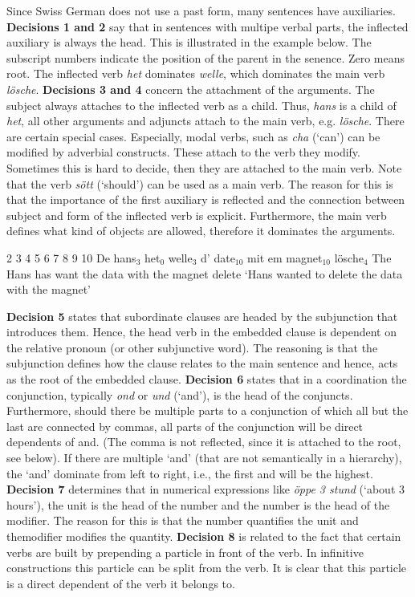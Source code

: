 \documentclass[11pt,letterpaper, covington]{article}
\begin{document}
Since Swiss German does not use a past form, many sentences have auxiliaries. \textbf{Decisions 1 and 2} say that in sentences with multipe verbal parts, the inflected auxiliary is always the head. This is illustrated in the example below. The subscript numbers indicate the position of the parent in the senence. Zero means root. The inflected verb \emph{het} dominates \emph{welle}, which dominates the main verb \emph{lösche}. \textbf{Decisions 3 and 4} concern the attachment of the arguments. The subject always attaches to the inflected verb as a child. Thus, \emph{hans} is a child of \emph{het}, all other arguments and adjuncts attach to the main verb, e.g. \emph{lösche}. There are certain special cases. Especially, modal verbs, such as \emph{cha} (`can') can be modified by adverbial constructs. These attach to the verb they modify. Sometimes this is hard to decide, then they are attached to the main verb.  Note that the verb \emph{sött} (`should') can be used as a main verb. The reason for this is that the importance of the first auxiliary is reflected and the connection between subject and form of the inflected verb is explicit. Furthermore, the main verb defines what kind of objects are allowed, therefore  it dominates the arguments.

 2 3 4 5 6 7 8 9 10
De hans$_3$ het$_0$ welle$_3$ d' date$_{10}$ mit em magnet$_{10}$ lösche$_4$
The Hans has want the data with the magnet delete
\glt `Hans wanted to delete the data with the magnet'
\glend

\textbf{Decision 5} states that subordinate clauses are headed by the subjunction that introduces them. Hence, the head verb in the embedded clause is dependent on the relative pronoun (or other subjunctive word). The reasoning is that the subjunction defines how the clause relates to the main sentence and hence, acts as the root of the embedded clause.
\textbf{Decision 6} states that in a coordination the conjunction, typically \emph{ond} or \emph{und} (`and'), is the head of the conjuncts. Furthermore, should there be multiple parts to a conjunction of which all but the last are connected by commas, all parts of the conjunction will be direct dependents of and. (The comma is not reflected, since it is attached to the root, see below). If there are multiple `and' (that are not semantically in a hierarchy), the `and' dominate from left to right, i.e., the first and will be the highest.
\textbf{Decision 7} determines that in numerical expressions like \emph{öppe 3 stund} (`about 3 hours'), the unit is the head of the number and the number is the head of the modifier. The reason for this is that the number quantifies the unit and themodifier modifies the quantity.
\textbf{Decision 8} is related to the fact that certain verbs are built by prepending a particle in front of the verb. In infinitive constructions this particle can be split from the verb. It is clear that this particle is a direct dependent of the verb it belongs to.
\end{document}
